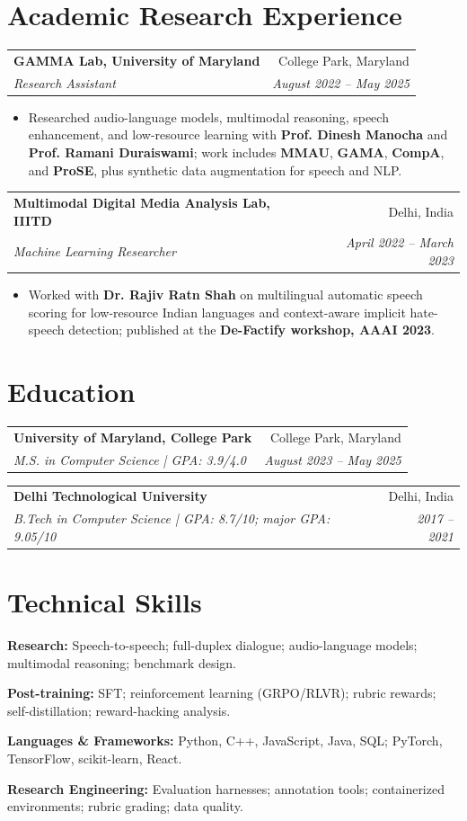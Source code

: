 \documentclass[letterpaper,11pt]{article}
\makeatletter
\newcommand{\role}[4]{%
  \Needspace{4\baselineskip}%
  \begin{tabularx}{\linewidth}{@{}Xr@{}}
    \textbf{#1} & \small #2\\
    \textit{#3} & \small\textit{#4}
  \end{tabularx}\vspace{-1pt}}
\newcommand{\skill}[2]{\textbf{#1:} #2\par\vspace{2pt}}
\makeatother
\begin{document}
\section{Academic Research Experience}
\role{GAMMA Lab, University of Maryland}{College Park, Maryland}
  {Research Assistant}{August 2022 -- May 2025}
\begin{itemize}
  \item Researched audio-language models, multimodal reasoning, speech enhancement, and low-resource learning with \textbf{Prof. Dinesh Manocha} and \textbf{Prof. Ramani Duraiswami}; work includes \textbf{MMAU}, \textbf{GAMA}, \textbf{CompA}, and \textbf{ProSE}, plus synthetic data augmentation for speech and NLP.
\end{itemize}
\role{Multimodal Digital Media Analysis Lab, IIITD}{Delhi, India}
  {Machine Learning Researcher}{April 2022 -- March 2023}
\begin{itemize}
  \item Worked with \textbf{Dr. Rajiv Ratn Shah} on multilingual automatic speech scoring for low-resource Indian languages and context-aware implicit hate-speech detection; published at the \textbf{De-Factify workshop, AAAI 2023}.
\end{itemize}

\section{Education}
\role{University of Maryland, College Park}{College Park, Maryland}
  {M.S. in Computer Science \enspace | \enspace GPA: 3.9/4.0}{August 2023 -- May 2025}
\par\vspace{4pt}
\role{Delhi Technological University}{Delhi, India}
  {B.Tech in Computer Science \enspace | \enspace GPA: 8.7/10; major GPA: 9.05/10}{2017 -- 2021}

\section{Technical Skills}
\skill{Research}{Speech-to-speech; full-duplex dialogue; audio-language models; multimodal reasoning; benchmark design.}
\skill{Post-training}{SFT; reinforcement learning (GRPO/RLVR); rubric rewards; self-distillation; reward-hacking analysis.}
\skill{Languages \& Frameworks}{Python, C++, JavaScript, Java, SQL; PyTorch, TensorFlow, scikit-learn, React.}
\skill{Research Engineering}{Evaluation harnesses; annotation tools; containerized environments; rubric grading; data quality.}
\end{document}
